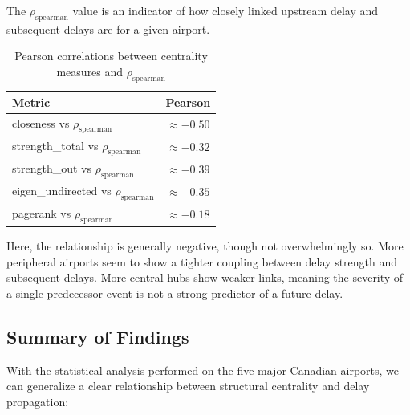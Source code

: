 \documentclass[10pt]{article}
\begin{document}
The $\rho_{\text{spearman}}$ value is an indicator of how closely linked upstream delay and subsequent delays are for a given airport.

\begin{table}[h!]
    \centering
    \caption{Pearson correlations between centrality measures and $\rho_{\text{spearman}}$}
    \begin{tabular}{l c}
        \toprule
        Metric & Pearson \\
        \midrule
        closeness vs $\rho_{\text{spearman}}$        & $\approx -0.50$ \\
        strength\_total vs $\rho_{\text{spearman}}$  & $\approx -0.32$ \\
        strength\_out vs $\rho_{\text{spearman}}$    & $\approx -0.39$ \\
        eigen\_undirected vs $\rho_{\text{spearman}}$& $\approx -0.35$ \\
        pagerank vs $\rho_{\text{spearman}}$         & $\approx -0.18$ \\
        \bottomrule
    \end{tabular}
\end{table}

Here, the relationship is generally negative, though not overwhelmingly so. More peripheral airports seem to show a tighter coupling between delay strength and subsequent delays. More central hubs show weaker links, meaning the severity of a single predecessor event is not a strong predictor of a future delay.

\subsection{Summary of Findings}

With the statistical analysis performed on the five major Canadian airports, we can generalize a clear relationship between structural centrality and delay propagation:
\end{document}
